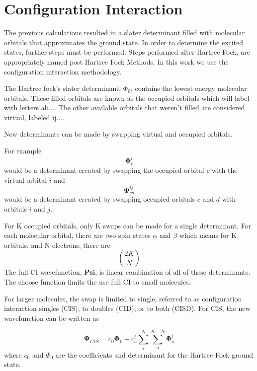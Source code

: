 \section{Configuration Interaction}
    The previous calculations resulted in a slater determinant filled with molecular orbitals that approximates the ground state.
    In order to determine the excited states, further steps must be performed.
    Steps performed after Hartree Fock, are appropriately named post Hartree Fock Methods.
    In this work we use the configuration interaction methodology.

    The Hartree fock's slater determinant, \(\Phi_0\), contains the lowest energy molecular orbitals.
    These filled orbitals are known as the occupied orbitals which will label with letters ab....
    The other available orbitals that weren't filled are considered virtual, labeled ij....

    New determinants can be made by swapping virtual and occupied orbitals.

    For example
    \begin{equation}
      \bm{\Phi}_c^i
    \end{equation}
    would be a determinant created by swapping the occupied orbital \(c\) with the virtual orbital \(i\) and
    \begin{equation}
      \bm{\Phi}_{cd}^{ij}
    \end{equation}
    would be a determinant created by swapping occupied orbitals \(c\) and \(d\) with orbitals \(i\) and \(j\).

    For K occupied orbitals, only K swaps can be made for a single determinant.
    For each molecular orbital, there are two spin states \(\alpha\) and \(\beta\) which means for K orbitals, and N electrons, there are
    \begin{equation}
      2K \choose N
    \end{equation}
    The full CI wavefunction, \(\bm{Psi}\), is linear combination of all of these determinants.
    The choose function limits the use full CI to small molecules.

    For larger molecules, the swap is limited to single, referred to as configuration interaction singles (CIS), to doubles (CID), or to both (CISD).
    For CIS, the new wavefunction can be written as

    \begin{equation}
    \bm{\Psi}_{CIS} = c_0\bm{\Phi}_0 + c_a^i\sum_i^N\sum_a^{K-N}\bm{\Phi}_a^i
    \end{equation}
    where \(c_0\) and \(\Phi_0\) are the coefficients and determinant for the Hartree Fock ground state.

